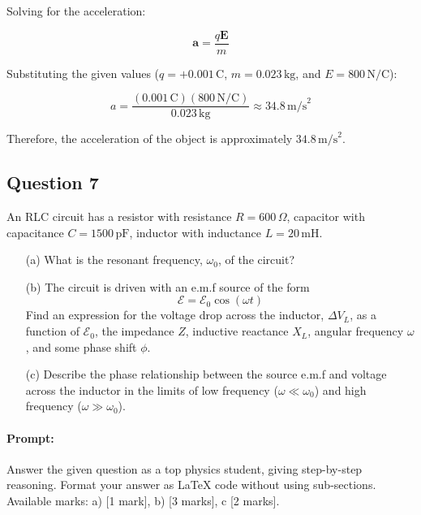 \documentclass{article}
\begin{document}
Solving for the acceleration:

\begin{equation*}
\mathbf{a} = \frac{q\mathbf{E}}{m}
\end{equation*}

Substituting the given values ($q = +0.001 \, \text{C}$, $m = 0.023 \, \text{kg}$, and $E = 800 \, \text{N/C}$):

\begin{equation*}
a = \frac{(0.001 \, \text{C})(800 \, \text{N/C})}{0.023 \, \text{kg}} \approx 34.8 \, \text{m/s}^2
\end{equation*}

Therefore, the acceleration of the object is approximately $34.8 \, \text{m/s}^2$.


\subsection{Question 7}
An RLC circuit has a resistor with resistance $R = 600\,\Omega$, capacitor with capacitance $C = 1500\,\mathrm{pF}$, inductor with inductance $L = 20\,\mathrm{mH}$.  

\begin{enumerate}
    \item[(a)] What is the resonant frequency, $\omega_0$, of the circuit?  

    \item[(b)] The circuit is driven with an e.m.f source of the form  
    \[
    \mathcal{E} = \mathcal{E}_0 \cos(\omega t)
    \]  
    Find an expression for the voltage drop across the inductor, $\Delta V_L$, as a function of $\mathcal{E}_0$, the impedance $Z$, inductive reactance $X_L$, angular frequency $\omega$, and some phase shift $\phi$.  

    \item[(c)] Describe the phase relationship between the source e.m.f and voltage across the inductor in the limits of low frequency ($\omega \ll \omega_0$) and high frequency ($\omega \gg \omega_0$).
\end{enumerate}


\paragraph{Prompt: \\} 
Answer the given question as a top physics student, giving step-by-step reasoning. Format your answer as LaTeX code without using sub-sections. Available marks: a) [1 mark], b) [3 marks], c [2 marks].
\end{document}
